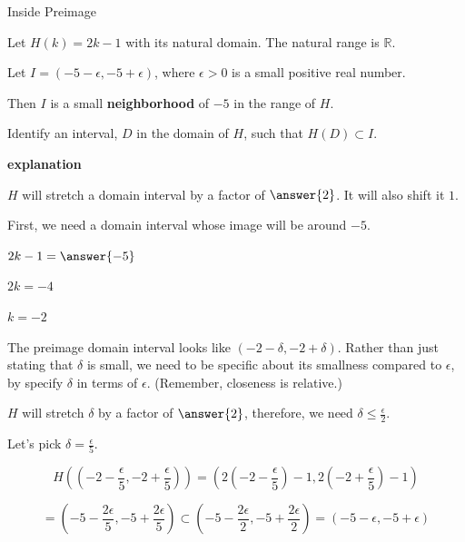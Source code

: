 \documentclass{ximera}
\begin{document}
\begin{example} Inside Preimage

Let $H(k) = 2k - 1$ with its natural domain.  The natural range is $\mathbb{R}$.

Let  $I = (-5-\epsilon, -5+\epsilon)$, where $\epsilon > 0$ is a small positive real number.  

Then $I$ is a small \textbf{neighborhood} of $-5$ in the range of $H$.


Identify an interval, $D$ in the domain of $H$, such that $H(D) \subset I$.

\textbf{\textcolor{red!75!green}{explanation}} 





$H$ will stretch a domain interval by a factor of $\answer{2}$.  It will also shift it $1$.  


First, we need a domain interval whose image will be around $-5$.

$2k - 1 = \answer{-5}$

$2k = -4$

$k = -2$



The preimage domain interval looks like $\left( -2 - \delta, -2 + \delta \right)$.  Rather than just stating that $\delta$ is small, we need to be specific about its smallness compared to $\epsilon$, by specify $\delta$ in terms of $\epsilon$. (Remember, closeness is relative.)

$H$ will stretch $\delta$ by a factor of $\answer{2}$, therefore,  we need $\delta \leq \frac{\epsilon}{2}$.   

Let's pick $\delta = \frac{\epsilon}{5}$. 




\[   H \left( \left( -2 - \frac{\epsilon}{5}, -2 + \frac{\epsilon}{5} \right) \right)  = \left( 2\left(-2 - \frac{\epsilon}{5}\right) - 1, 2\left(-2 + \frac{\epsilon}{5}\right) - 1  \right)\]


\[    = \left( -5 - \frac{2 \epsilon}{5} , -5 + \frac{2 \epsilon}{5} \right) \subset \left( -5 - \frac{2 \epsilon}{2} , -5 + \frac{2 \epsilon}{2} \right)  = (-5-\epsilon, -5+\epsilon) \]




\end{example}
\end{document}
